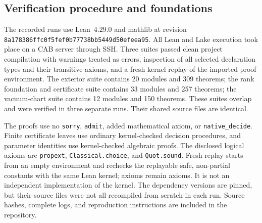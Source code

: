 \subsection{Verification procedure and foundations}

The recorded runs use Lean~4.29.0 and mathlib at revision
\texttt{8a178386ffc0f5fef0b77738bb5449d50efeea95}.
All Lean and Lake execution took place on a CAB server through SSH.
Three suites passed clean project compilation with warnings treated as
errors, inspection of all selected declaration types and their transitive
axioms, and a fresh kernel replay of the imported proof environment.
The exterior suite contains 20 modules and 309 theorems; the rank
foundation and certificate suite contains 33 modules and 257 theorems;
the vacuum-chart suite contains 12 modules and 150 theorems. These suites
overlap and were verified in three separate runs. Their shared source
files are identical.

The proofs use no \texttt{sorry}, \texttt{admit}, added mathematical axiom,
or \texttt{native\_decide}. Finite certificate leaves use ordinary
kernel-checked decision procedures, and parameter identities use
kernel-checked algebraic proofs. The disclosed logical axioms are
\texttt{propext}, \texttt{Classical.choice}, and \texttt{Quot.sound}.
Fresh replay starts from an empty environment and rechecks the replayable
safe, non-partial constants with the same Lean kernel; axioms remain axioms.
It is not an independent implementation of the kernel. The dependency
versions are pinned, but their source files were not all recompiled from
scratch in each run. Source hashes, complete logs, and reproduction
instructions are included in the repository.
